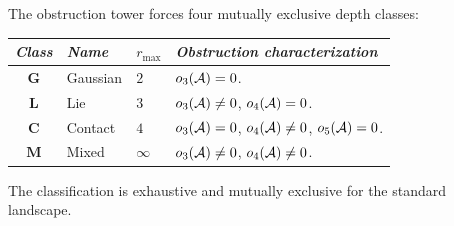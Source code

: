 \begin{theorem}
\label{thm:thqg-four-class}
\ClaimStatusProvedHere
{}
The obstruction tower forces four mutually exclusive
depth classes:
\begin{center}
\small
\renewcommand{\arraystretch}{1.15}
\begin{tabular}{clll}
\toprule
\emph{Class} & \emph{Name} & $r_{\max}$ &
\emph{Obstruction characterization} \\
\midrule
$\mathbf{G}$ & Gaussian &
 $2$ &
 $o_3(\mathcal{A}) = 0$. \\
$\mathbf{L}$ & Lie &
 $3$ &
 $o_3(\mathcal{A}) \neq 0$, $o_4(\mathcal{A}) = 0$. \\
$\mathbf{C}$ & Contact &
 $4$ &
 $o_3(\mathcal{A}) = 0$, $o_4(\mathcal{A}) \neq 0$, $o_5(\mathcal{A}) = 0$. \\
$\mathbf{M}$ & Mixed &
 $\infty$ &
 $o_3(\mathcal{A}) \neq 0$, $o_4(\mathcal{A}) \neq 0$.\\
\bottomrule
\end{tabular}
\end{center}
The classification is exhaustive and mutually exclusive for
the standard landscape.
\end{theorem}

